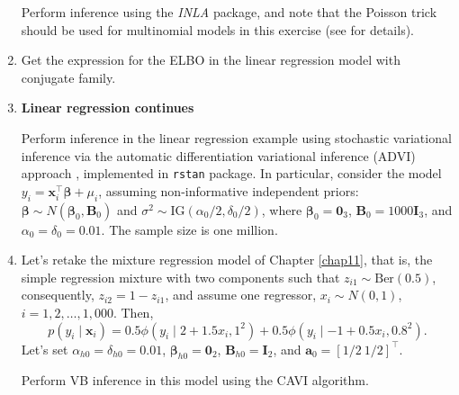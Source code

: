 \begin{enumerate}
Perform inference using the \textit{INLA} package, and note that the Poisson trick should be used for multinomial models in this exercise (see \cite{serafini2019multinomial} for details).	
	
\item Get the expression for the ELBO in the linear regression model with conjugate family.

\item \textbf{Linear regression continues}

Perform inference in the linear regression example using stochastic variational inference via the automatic differentiation variational inference (ADVI) approach \cite{kucukelbir2017automatic}, implemented in \texttt{rstan} package. In particular, consider the model $y_i = \boldsymbol{x}_i^{\top} \boldsymbol{\beta} + \mu_i$, assuming non-informative independent priors: $\boldsymbol{\beta} \sim N(\boldsymbol{\beta}_0, \boldsymbol{B}_0)$ and $\sigma^2 \sim \mathrm{IG}(\alpha_0/2, \delta_0/2)$, where $\boldsymbol{\beta}_0 = \boldsymbol{0}_3$, $\boldsymbol{B}_0 = 1000\boldsymbol{I}_3$, and $\alpha_0 = \delta_0 = 0.01$. The sample size is one million.

\item Let's retake the mixture regression model of Chapter \ref{chap11}, that is, the simple regression mixture with two components such that $z_{i1}\sim \text{Ber}(0.5)$, consequently, $z_{i2}=1-z_{i1}$, and assume one regressor, $x_i\sim N(0,1)$, $i=1,2,\dots,1,000$. Then, 
$$p(y_i \mid \boldsymbol{x}_i) = 
0.5 \phi(y_i \mid 2+1.5x_i,1^2)+0.5 \phi(y_i \mid -1+0.5x_i,0.8^2).$$
Let's set $\alpha_{h0}=\delta_{h0}=0.01$, $\boldsymbol{\beta}_{h0}=\boldsymbol{0}_2$, $\boldsymbol{B}_{h0}=\boldsymbol{I}_2$, and $\boldsymbol{a}_0=[1/2 \ 1/2]^{\top}$.

Perform VB inference in this model using the CAVI algorithm.  
	
\end{enumerate}


